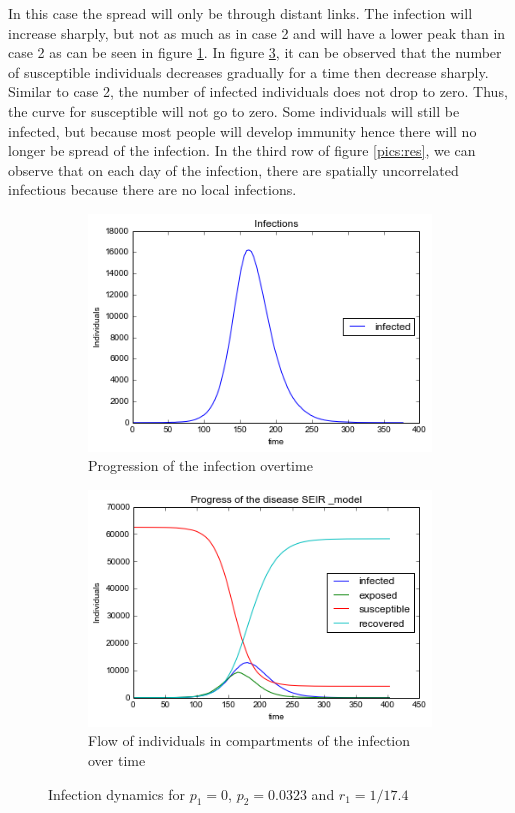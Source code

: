 In this case the spread will only be through distant links. The infection will increase sharply, but not as much as in case 2 and will have a lower peak than in case 2 as can be seen in figure \ref{a31}. In figure \ref{a32}, it can be observed that the number of susceptible individuals decreases gradually for a time then decrease sharply. Similar to case 2, the number of infected individuals does not drop to zero. Thus, the curve for susceptible will not go to zero. Some individuals will still be infected, but because most people will develop immunity hence there will no longer be spread of the infection. In the third row of figure \ref{pics:res}, we can observe that on each day of the infection, there are spatially uncorrelated infectious because there are no local infections.

\begin{figure}[h!]
    \centering
    \begin{subfigure}[b]{0.45\textwidth}
        \includegraphics[width=\textwidth]{images/2infections}
        \caption{Progression of the infection overtime}
        \label{a31}
    \end{subfigure}
     \begin{subfigure}[b]{0.5\textwidth}
        \includegraphics[width=\textwidth]{images/2SEIRmodel}
        \caption{  Flow of individuals in compartments of the infection over time}
        \label{a32}
    \end{subfigure}
  \caption{Infection dynamics for $p_1 = 0$, $p_2=0.0323$ and $r_1 = 1/17.4$}
 \end{figure}
 

